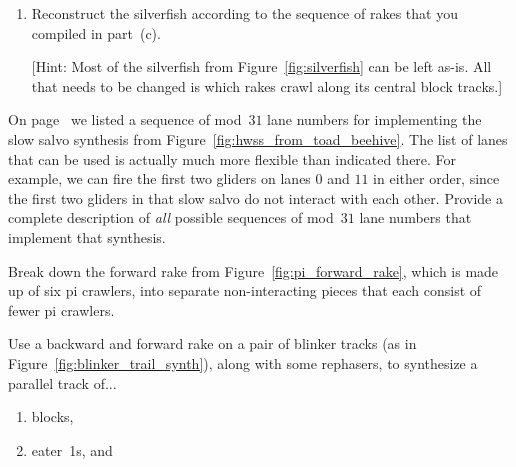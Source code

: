 \begin{multicols}{2}
\begin{problem}
\begin{enumerate}[label=\bf\color{ocre}(\alph*)]
			\item {} Reconstruct the silverfish according to the sequence of rakes that you compiled in part~(c).
			
			[Hint: Most of the silverfish from Figure~\ref{fig:silverfish} can be left as-is. All that needs to be changed is which rakes crawl along its central block tracks.]
		\end{enumerate}
	\end{problem}
	
	
	\mfilbreak
	
	
	\begin{problemstar}\label{exer:silverfish_list_of_lanes} 
		On page~\pageref{page:silverfish_lanes} we listed a sequence of mod~$31$ lane numbers for implementing the slow salvo synthesis from Figure~\ref{fig:hwss_from_toad_beehive}. The list of lanes that can be used is actually much more flexible than indicated there. For example, we can fire the first two gliders on lanes $0$ and $11$ in either order, since the first two gliders in that slow salvo do not interact with each other. Provide a complete description of \emph{all} possible sequences of mod~$31$ lane numbers that implement that synthesis.
	\end{problemstar}
	
	
	\mfilbreak
	
	
	\begin{problem}\label{exer:pi_forward_rake_break_apart} 
		Break down the forward rake from Figure~\ref{fig:pi_forward_rake}, which is made up of six pi crawlers, into separate non-interacting pieces that each consist of fewer pi crawlers.
	\end{problem}


	\mfilbreak
	
	
	\begin{problem}\label{exer:two_pi_tracks_synth_objects}
		Use a backward and forward rake on a pair of blinker tracks (as in Figure~\ref{fig:blinker_trail_synth}), along with some rephasers, to synthesize a parallel track of...\smallskip
		
		\begin{enumerate}[label=\bf\color{ocre}(\alph*)]
			\item {} blocks,
			
			\item {} eater~1s, and
			

\end{enumerate}
\end{problem}
\end{multicols}
